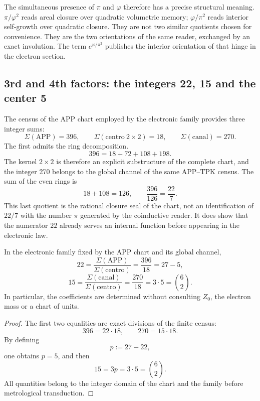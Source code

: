The simultaneous presence of \(\pi\) and \(\varphi\) therefore has a precise structural meaning. \(\pi/\varphi^2\) reads areal closure over quadratic volumetric memory; \(\varphi/\pi^2\) reads interior self-growth over quadratic closure. They are not two similar quotients chosen for convenience. They are the two orientations of the same reader, exchanged by an exact involution. The term \(e^{\varphi/\pi^2}\) publishes the interior orientation of that hinge in the electron section.

\subsection{3rd and 4th factors: the integers 22, 15 and the center 5}

The census of the APP chart employed by the electronic family provides
three integer sums:
\[
 \Sigma(\mathrm{APP})=396,
 \qquad
 \Sigma(\mathrm{centro}\ 2\times2)=18,
 \qquad
 \Sigma(\mathrm{canal})=270.
\]
The first admits the ring decomposition.
\[
 396=18+72+108+198.
\]
The kernel \(2\times2\) is therefore an explicit substructure of the
complete chart, and the integer 270 belongs to the global channel of the same
APP--TPK census.
The sum of the even rings is
\[
 18+108=126,
 \qquad
 \frac{396}{126}=\frac{22}{7}.
\]
This last quotient is the rational closure seal of the chart, not an
identification of \(22/7\) with the number \(\pi\) generated by the coinductive
reader. It does show that the numerator \(22\) already serves an
internal function before appearing in the electronic law.

\begin{theorem}
\label{thm:coeficientes-electron-rev6}
In the electronic family fixed by the APP chart and its global channel,
\[
 \boxed{
 22=\frac{\Sigma(\mathrm{APP})}
 {\Sigma(\mathrm{centro})}
 =\frac{396}{18}=27-5,}
\]
\[
 \boxed{
 15=\frac{\Sigma(\mathrm{canal})}
 {\Sigma(\mathrm{centro})}
 =\frac{270}{18}=3\cdot5=\binom62.}
\]
In particular, the coefficients are determined without consulting
\(Z_0\), the electron mass or a chart of units.
\end{theorem}

\begin{proof}
The first two equalities are exact divisions of the finite census:
\[
 396=22\cdot18,
 \qquad
 270=15\cdot18.
\]
By defining
\[
 p:=27-22,
\]
one obtains \(p=5\), and then
\[
 15=3p=3\cdot5=\binom62.
\]
All quantities belong to the integer domain of the chart and the
family before metrological transduction.
\end{proof}

